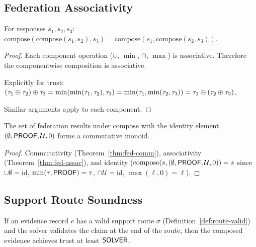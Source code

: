 \documentclass[11pt]{article}
\newcommand{\OracleComp}{\mathrm{compose}}
\begin{document}
\subsection{Federation Associativity}
\label{sec:formal:assoc}

\begin{theorem}
\label{thm:fed-assoc}
For responses $s_1, s_2, s_3$:
$\OracleComp(\OracleComp(s_1, s_2), s_3)
= \OracleComp(s_1, \OracleComp(s_2, s_3))$.
\end{theorem}

\begin{proof}
Each component operation ($\cup$, $\min$, $\cap$, $\max$)
is associative.  Therefore the componentwise composition is
associative.

Explicitly for trust:
$(\tau_1 \oplus \tau_2) \oplus \tau_3
= \min(\min(\tau_1, \tau_2), \tau_3)
= \min(\tau_1, \min(\tau_2, \tau_3))
= \tau_1 \oplus (\tau_2 \oplus \tau_3)$.

Similar arguments apply to each component.
\end{proof}

\begin{corollary}
\label{cor:fed-monoid}
The set of federation results under $\OracleComp$ with the identity
element $(\emptyset, \mathsf{PROOF}, \mathcal{U}, 0)$ forms a commutative
monoid.
\end{corollary}

\begin{proof}
Commutativity (Theorem~\ref{thm:fed-comm}), associativity
(Theorem~\ref{thm:fed-assoc}), and identity
($\OracleComp(s, (\emptyset, \Tproof, \mathcal{U}, 0)) = s$
since $\cup \emptyset = \mathrm{id}$, $\min(\tau, \mathsf{PROOF}) = \tau$,
$\cap \mathcal{U} = \mathrm{id}$, $\max(\ell, 0) = \ell$).
\end{proof}

\subsection{Support Route Soundness}
\label{sec:formal:routes}

\begin{theorem}
\label{thm:route-sound}
If an evidence record $e$ has a valid support route $\sigma$
(Definition~\ref{def:route-valid}) and the solver validates
the claim at the end of the route, then the composed evidence
achieves trust at least $\mathsf{SOLVER}$.
\end{theorem}
\end{document}
